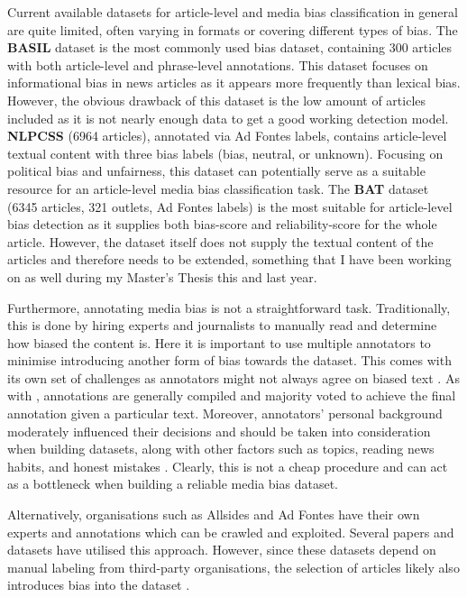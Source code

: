 Current available datasets for article-level and media bias classification in general are quite limited, often varying in formats or covering different types of bias. The \textbf{BASIL} dataset \cite{fan-2019-basil} is the most commonly used bias dataset, containing 300 articles with both article-level and phrase-level annotations. This dataset focuses on informational bias in news articles as it appears more frequently than lexical bias. However, the obvious drawback of this dataset is the low amount of articles included as it is not nearly enough data to get a good working detection model. \textbf{NLPCSS} \cite{chen-2020-nlpcss} (6964 articles), annotated via Ad Fontes labels, contains article-level textual content with three bias labels (bias, neutral, or unknown). Focusing on political bias and unfairness, this dataset can potentially serve as a suitable resource for an article-level media bias classification task. The \textbf{BAT} \cite{spinde-2023-bat} dataset (6345 articles, 321 outlets, Ad Fontes labels) is the most suitable for article-level bias detection as it supplies both bias-score and reliability-score for the whole article. However, the dataset itself does not supply the textual content of the articles and therefore needs to be extended, something that I have been working on as well during my Master's Thesis this and last year.

Furthermore, annotating media bias is not a straightforward task. Traditionally, this is done by hiring experts and journalists to manually read and determine how biased the content is. Here it is important to use multiple annotators to minimise introducing another form of bias towards the dataset. This comes with its own set of challenges as annotators might not always agree on biased text \cite{lim-2018-understanding}. As with \cite{spinde-2021-babe}, annotations are generally compiled and majority voted to achieve the final annotation given a particular text. Moreover, annotators' personal background moderately influenced their decisions and should be taken into consideration when building datasets, along with other factors such as topics, reading news habits, and honest mistakes \cite{spinde-2021-bias-words}. Clearly, this is not a cheap procedure and can act as a bottleneck when building a reliable media bias dataset.

Alternatively, organisations such as Allsides \cite{allsides} and Ad Fontes \cite{adfontes} have their own experts and annotations which can be crawled and exploited. Several papers and datasets \cite{spinde-2023-bat,chen-2020-nlpcss,kulkarni-2018-multi-view} have utilised this approach. However, since these datasets depend on manual labeling from third-party organisations, the selection of articles likely also introduces bias into the dataset \cite{spinde-2023-bat}.


